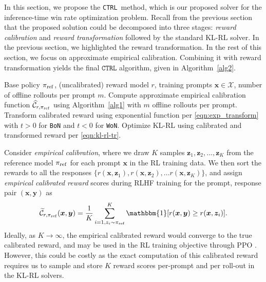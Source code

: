 \documentclass{article}
\newcommand{\by}{{\bm{y}}}
\newcommand{\bx}{{\bm{x}}}
\newcommand{\bz}{{\bm{z}}}
\newcommand{\bp}{{\pi_{\rm ref}}} %
\newcommand{\ctrl}{\texttt{CTRL}\xspace}
\newcommand{\car}{\mathcal{C}} %
\newcommand{\bofn}{\texttt{BoN}\xspace}
\newcommand{\wofn}{\texttt{WoN}\xspace}
\begin{document}
%

In this section, we propose the \ctrl\ method, which is our proposed solver for the inference-time win rate optimization problem. Recall from the previous section that the proposed solution could be decomposed into three stages: {\em reward calibration} and {\em reward transformation} followed by the standard KL-RL solver. In the previous section, we highlighted the reward transformation. In the rest of this section, we focus on approximate empirical calibration. Combining it with reward transformation yields the final $\ctrl$ algorithm, given in Algorithm~\ref{alg2}.


%



%
%

%
%
%

%
%


\begin{algorithm}[ht]
\caption{\ctrl Algorithm for \bofn and \wofn} \label{alg2}
\begin{algorithmic}[1]
\Require Base policy $\bp$, (uncalibrated) reward model $r$, training prompts $\bx \in \mathcal{X}$, number of offline rollouts per prompt $m$. 
\State Compute approximate empirical calibration function $\widehat{\car}_{r, \bp} $ using Algorithm~\ref{alg1} with $m$ offline rollouts per prompt.
\State Transform calibrated reward using exponential function per  \cref{eqn:exp_transform} with $t>0$ for \bofn and $t < 0$ for \wofn.
\State Optimize KL-RL using calibrated and transformed reward per \cref{eqn:kl-rl-tr}.
\end{algorithmic}
\end{algorithm}



%
Consider {\em empirical calibration}, where we draw $K$ samples $\bz_1,\bz_2, ..., \bz_K$ from the reference model $\bp$ for each prompt $\bx$ in the RL training data. We then sort the rewards to all the responses $\{r(\bx, \bz_1), r(\bx, \bz_2),... r(\bx, \bz_K)\}$, and assign {\em empirical calibrated reward} scores during RLHF training for the prompt, response pair $(\bx, \by)$ as  
%
%
\begin{align}
    \widetilde{\car}_{r, \bp}(\bx, \by) = \frac{1}{K} \sum_{i=1, z_i \sim \bp}^K  \mathbbm{1} [r(\bx, \by) \geq r(\bx, \bz_i) ].
\end{align}
Ideally, as $K \rightarrow \infty$, the empirical calibrated reward would converge to the true calibrated reward, and may be used in the RL training objective through PPO \citep{schulman2017proximal}. However, this could be costly
%
as the exact computation of this calibrated reward requires us to sample and store $K$ reward scores per-prompt and per roll-out in the KL-RL solvers. 
\end{document}

